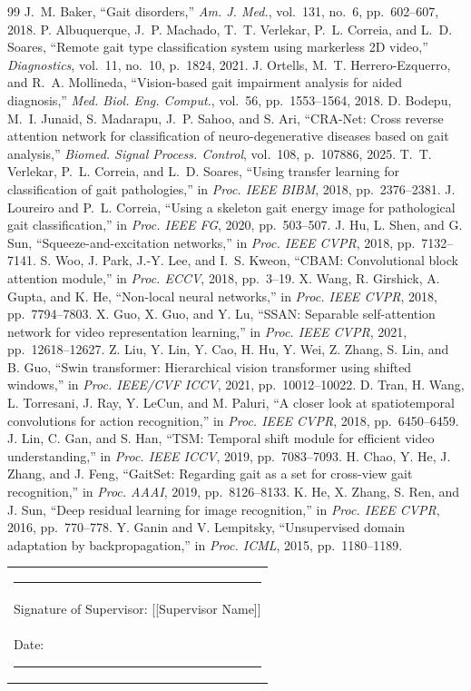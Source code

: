 \documentclass[conference]{IEEEtran}
\begin{document}
\begin{thebibliography}{99}
\footnotesize
{} J.~M. Baker, ``Gait disorders,'' \emph{Am. J. Med.},
vol.~131, no.~6, pp.~602--607, 2018.
 P. Albuquerque, J.~P. Machado, T.~T. Verlekar,
P.~L. Correia, and L.~D. Soares, ``Remote gait type classification system using
markerless 2D video,'' \emph{Diagnostics}, vol.~11, no.~10, p.~1824, 2021.
 J. Ortells, M.~T. Herrero-Ezquerro, and R.~A. Mollineda,
``Vision-based gait impairment analysis for aided diagnosis,'' \emph{Med. Biol.
Eng. Comput.}, vol.~56, pp.~1553--1564, 2018.
 D. Bodepu, M.~I. Junaid, S. Madarapu, J.~P. Sahoo, and
S. Ari, ``CRA-Net: Cross reverse attention network for classification of
neuro-degenerative diseases based on gait analysis,'' \emph{Biomed. Signal
Process. Control}, vol.~108, p.~107886, 2025.
 T.~T. Verlekar, P.~L. Correia, and L.~D. Soares,
``Using transfer learning for classification of gait pathologies,'' in
\emph{Proc. IEEE BIBM}, 2018, pp.~2376--2381.
 J. Loureiro and P.~L. Correia, ``Using a skeleton gait
energy image for pathological gait classification,'' in \emph{Proc. IEEE FG},
2020, pp.~503--507.
 J. Hu, L. Shen, and G. Sun, ``Squeeze-and-excitation
networks,'' in \emph{Proc. IEEE CVPR}, 2018, pp.~7132--7141.
 S. Woo, J. Park, J.-Y. Lee, and I.~S. Kweon, ``CBAM:
Convolutional block attention module,'' in \emph{Proc. ECCV}, 2018, pp.~3--19.
 X. Wang, R. Girshick, A. Gupta, and K. He,
``Non-local neural networks,'' in \emph{Proc. IEEE CVPR}, 2018, pp.~7794--7803.
 X. Guo, X. Guo, and Y. Lu, ``SSAN: Separable
self-attention network for video representation learning,'' in \emph{Proc. IEEE
CVPR}, 2021, pp.~12618--12627.
 Z. Liu, Y. Lin, Y. Cao, H. Hu, Y. Wei, Z. Zhang, S. Lin,
and B. Guo, ``Swin transformer: Hierarchical vision transformer using shifted
windows,'' in \emph{Proc. IEEE/CVF ICCV}, 2021, pp.~10012--10022.
 D. Tran, H. Wang, L. Torresani, J. Ray, Y. LeCun, and
M. Paluri, ``A closer look at spatiotemporal convolutions for action
recognition,'' in \emph{Proc. IEEE CVPR}, 2018, pp.~6450--6459.
 J. Lin, C. Gan, and S. Han, ``TSM: Temporal shift module
for efficient video understanding,'' in \emph{Proc. IEEE ICCV}, 2019,
pp.~7083--7093.
 H. Chao, Y. He, J. Zhang, and J. Feng, ``GaitSet:
Regarding gait as a set for cross-view gait recognition,'' in \emph{Proc.
AAAI}, 2019, pp.~8126--8133.
 K. He, X. Zhang, S. Ren, and J. Sun, ``Deep residual
learning for image recognition,'' in \emph{Proc. IEEE CVPR}, 2016, pp.~770--778.
 Y. Ganin and V. Lempitsky, ``Unsupervised domain adaptation
by backpropagation,'' in \emph{Proc. ICML}, 2015, pp.~1180--1189.
\end{thebibliography}

\vspace{4mm}
\noindent\begin{tabular}{@{}l@{}}
\rule{4.5cm}{0.4pt}\\
Signature of Supervisor: [[Supervisor Name]]\\
Date: \rule{2.5cm}{0.4pt}
\end{tabular}
\end{document}
